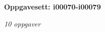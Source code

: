 \centerline{\bf Oppgavesett: i00070-i00079}
\vskip 10pt
\centerline{\it 10 oppgaver}\vskip 10pt
\vskip 10pt

